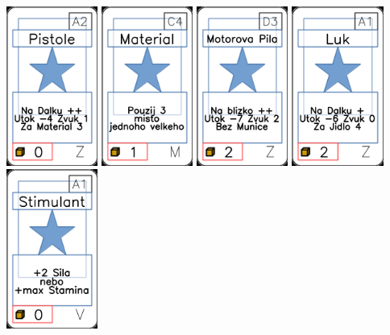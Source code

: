 \documentclass[a4paper]{article}
\begin{document}
	\includegraphics[width=3.0cm]{img-1_91}
	\includegraphics[width=3.0cm]{img-1_43}
	\includegraphics[width=3.0cm]{img-1_107}
	\includegraphics[width=3.0cm]{img-1_90}
	\includegraphics[width=3.0cm]{img-1_60}
\end{document}
